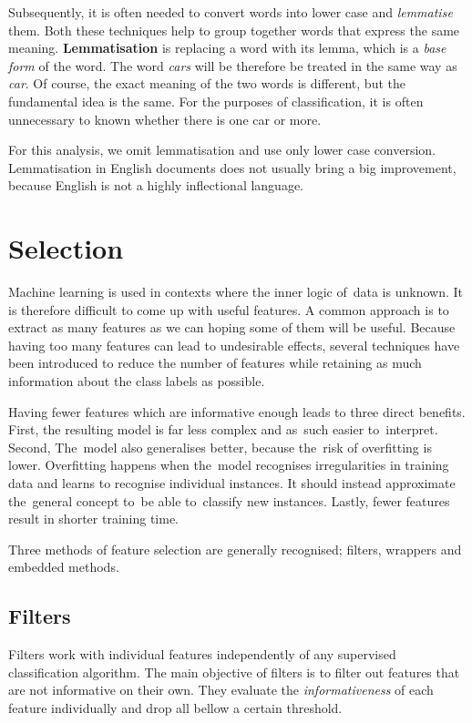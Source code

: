 Subsequently, it is often needed to convert words into lower case and {\it lemmatise} them.
Both these techniques help to group together words that express the same meaning.
{\bf Lemmatisation} is replacing a word with its lemma, which is a {\it base form} of the word.
The word \textit{cars} will be therefore be treated in the same way as \textit{car}.
Of course, the exact meaning of the two words is different,
but the fundamental idea is the same.
For the purposes of classification, it is often unnecessary to known whether there is one car or more.

For this analysis, we omit lemmatisation and use only lower case conversion.
Lemmatisation in English documents does not usually bring a big improvement,
because English is not a highly inflectional language.

\section{Selection}

Machine learning is used in contexts where the inner logic of~data is unknown.
It is therefore difficult to come up with useful features.
A common approach is to extract as many features as we can hoping some of them will be useful.
Because having too many features can lead to undesirable effects,
several techniques have been introduced to reduce the number of features
while retaining as much information about the class labels as possible.

Having fewer features which are informative enough leads to three direct benefits.
First, the resulting model is far less complex and as~such easier to~interpret.
Second, The~model also generalises better, because the~risk of overfitting is lower.
Overfitting happens when the~model recognises irregularities in training data
and learns to recognise individual instances.
It should instead approximate the~general concept to~be able to~classify new instances.
Lastly, fewer features result in shorter training time.

Three methods of feature selection are generally recognised; filters, wrappers and embedded methods.

\subsection{Filters}
\label{subsec:filters}

Filters work with individual features independently of any supervised classification algorithm.
The main objective of filters is to filter out features that are not informative on their own.
They evaluate the \textit{informativeness} of each feature individually
and drop all bellow a certain threshold.

